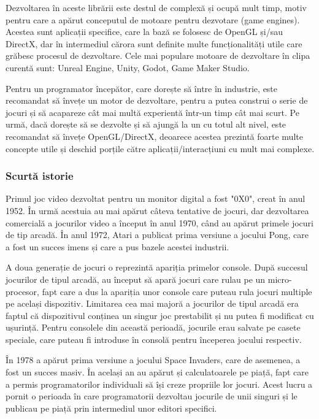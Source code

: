 \documentclass[12pt, a4paper]{article}
\begin{document}
	Dezvoltarea în aceste librării este destul de complexă și ocupă mult timp, motiv pentru care a apărut conceputul de motoare pentru dezvotare (game engines). Acestea sunt aplicații specifice, care la bază se folosesc de OpenGL și/sau DirectX, dar 
	în intermediul cărora sunt definite multe funcționalități utile care grăbesc procesul de dezvoltare. Cele mai populare motoare de dezvoltare în clipa curentă sunt: Unreal Engine, Unity, Godot, Game Maker Studio.
	\newline
	
	Pentru un programator începător, care dorește să între în industrie, este recomandat să învețe un motor de dezvoltare, pentru a putea construi o serie de jocuri și să acapareze cât mai multă experientă într-un timp cât mai scurt. Pe urmă, dacă dorește să se dezvolte și să ajungă la un cu totul alt nivel, este recomandat să învețe OpenGL/DirectX, deoarece acestea prezintă foarte multe concepte utile și deschid porțile către aplicații/interacțiuni cu mult mai complexe.
	
	
	
	
	\subsubsection{Scurtă istorie}
	
	Primul joc video dezvoltat pentru un monitor digital a fost "0X0", creat în anul 1952. În urmă acestuia au mai apărut câteva tentative de jocuri, dar dezvoltarea comercială a jocurilor video a început în anul 1970, când au apărut primele jocuri de tip arcadă. În anul 1972, Atari a publicat prima versiune a jocului Pong, care a fost un succes imens și care a pus bazele acestei industrii.
	\newline
	
	A doua generație de jocuri o reprezintă apariția primelor console. După succesul jocurilor de tipul arcadă, au început să apară jocuri care rulau pe un micro-procesor, fapt care a dus la apariția unor console care puteau rula jocuri multiple pe același dispozitiv. Limitarea cea mai majoră a jocurilor de tipul arcadă era faptul că dispozitivul conținea un singur joc prestabilit și nu putea fi modificat cu ușurință. Pentru consolele din această perioadă, jocurile erau salvate pe casete speciale, care puteau fi introduse în consolă pentru începerea jocului respectiv.
	\newline
	
	În 1978 a apărut prima versiune a jocului Space Invaders, care de asemenea, a fost un succes masiv. În același an au apărut și calculatoarele pe piață, fapt care a permis programatorilor individuali să își creze propriile lor jocuri. Acest lucru a pornit o perioada în care programatorii dezvoltau jocurile de unii singuri și le publicau pe piață prin intermediul unor editori specifici.
	\newline
	
\end{document}
